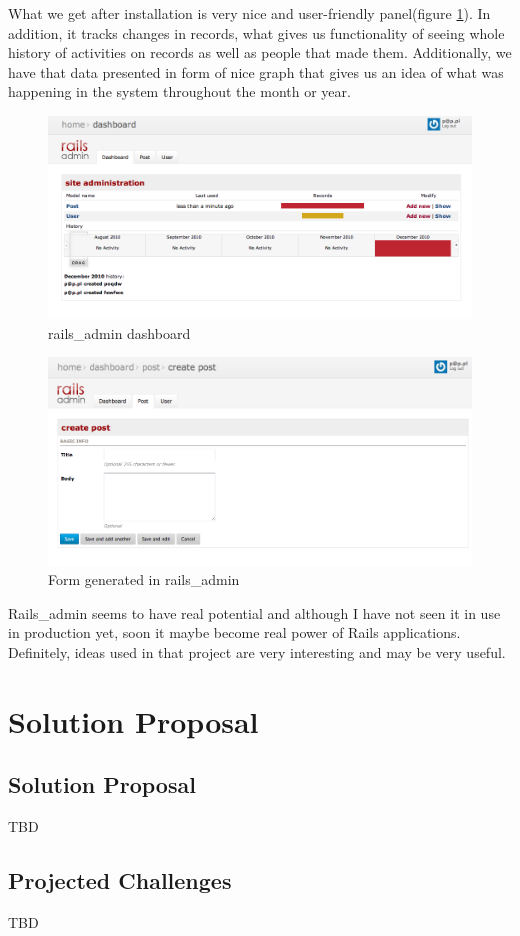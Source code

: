   What we get after installation is very nice and user-friendly panel(figure \ref{railsadmin1}). In addition, it tracks changes in records, what gives us functionality of seeing whole history of activities on records as well as people that made them. Additionally, we have that data presented in form of nice graph that gives us an idea of what was happening in the system throughout the month or year.
  
  
  \begin{figure}[hbt!]
		\begin{center}
			\includegraphics[width=\linewidth]{images/chapter01/railsadmin1.png}
			\caption{rails\_admin dashboard}
			\label{railsadmin1}
		\end{center}
	\end{figure}
	
	\begin{figure}[hbt!]
		\begin{center}
			\includegraphics[width=\linewidth]{images/chapter01/railsadmin2.png}
			\caption{Form generated in rails\_admin }
			\label{railsadmin2}
		\end{center}
	\end{figure}

  Rails\_admin seems to have real potential and although I have not seen it in use in production yet, soon it maybe become real power of Rails applications. Definitely, ideas used in that project are very interesting and may be very useful.
  
  \section{Solution Proposal}
    \subsection{Solution Proposal}
    TBD
  
    \subsection{Projected Challenges}
    TBD